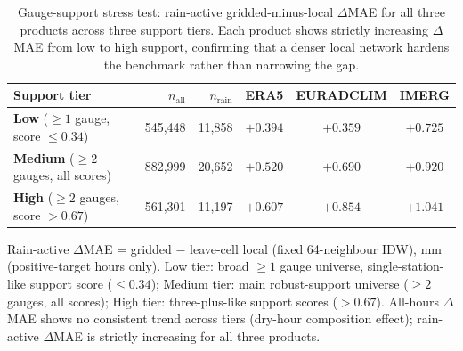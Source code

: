 \begin{table}[t]
\centering
\begin{threeparttable}
\caption{Gauge-support stress test: rain-active gridded-minus-local $\Delta$MAE for all three products across three support tiers. Each product shows strictly increasing $\Delta$MAE from low to high support, confirming that a denser local network hardens the benchmark rather than narrowing the gap.}
\label{tab:support-stress}
\footnotesize
\setlength{\tabcolsep}{5pt}
\begin{tabular}{lrrccc}
\toprule
Support tier & $n_\text{all}$ & $n_\text{rain}$ & ERA5 & EURADCLIM & IMERG \\
\midrule
\textbf{Low} (${\geq}1$ gauge, score ${\leq}0.34$) & 545,448 & 11,858 & $+0.394$ & $+0.359$ & $+0.725$ \\
\textbf{Medium} (${\geq}2$ gauges, all scores) & 882,999 & 20,652 & $+0.520$ & $+0.690$ & $+0.920$ \\
\textbf{High} (${\geq}2$ gauges, score ${>}0.67$) & 561,301 & 11,197 & $+0.607$ & $+0.854$ & $+1.041$ \\
\bottomrule
\end{tabular}
\begin{tablenotes}
\footnotesize
\item Rain-active $\Delta$MAE = gridded $-$ leave-cell local (fixed 64-neighbour IDW), mm (positive-target hours only). Low tier: broad ${\geq}1$ gauge universe, single-station-like support score (${\leq}0.34$); Medium tier: main robust-support universe (${\geq}2$ gauges, all scores); High tier: three-plus-like support scores ($>{0.67}$). All-hours $\Delta$MAE shows no consistent trend across tiers (dry-hour composition effect); rain-active $\Delta$MAE is strictly increasing for all three products.
\end{tablenotes}
\end{threeparttable}
\end{table}